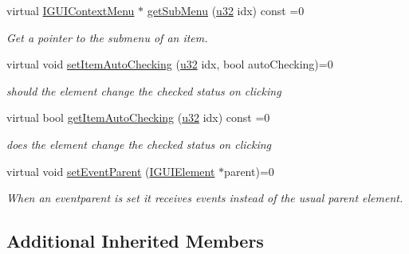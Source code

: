\begin{DoxyCompactItemize}
virtual \hyperlink{classirr_1_1gui_1_1IGUIContextMenu}{I\+G\+U\+I\+Context\+Menu} $\ast$ \hyperlink{classirr_1_1gui_1_1IGUIContextMenu_a296cfd0c4944b2c0bfb88973401fb824}{get\+Sub\+Menu} (\hyperlink{namespaceirr_a0416a53257075833e7002efd0a18e804}{u32} idx) const =0
\begin{DoxyCompactList}\small\item\em Get a pointer to the submenu of an item. \end{DoxyCompactList}\item 
\mbox{\label{classirr_1_1gui_1_1IGUIContextMenu_ab393d00ca81ee9482c5a81d19cc6e79e}} 
virtual void \hyperlink{classirr_1_1gui_1_1IGUIContextMenu_ab393d00ca81ee9482c5a81d19cc6e79e}{set\+Item\+Auto\+Checking} (\hyperlink{namespaceirr_a0416a53257075833e7002efd0a18e804}{u32} idx, bool auto\+Checking)=0
\begin{DoxyCompactList}\small\item\em should the element change the checked status on clicking \end{DoxyCompactList}\item 
\mbox{\label{classirr_1_1gui_1_1IGUIContextMenu_ae1c7364f115e633bcfc040864e30f4c1}} 
virtual bool \hyperlink{classirr_1_1gui_1_1IGUIContextMenu_ae1c7364f115e633bcfc040864e30f4c1}{get\+Item\+Auto\+Checking} (\hyperlink{namespaceirr_a0416a53257075833e7002efd0a18e804}{u32} idx) const =0
\begin{DoxyCompactList}\small\item\em does the element change the checked status on clicking \end{DoxyCompactList}\item 
\mbox{\label{classirr_1_1gui_1_1IGUIContextMenu_a2d87831a224817fc9c9dd8f41c69ac0a}} 
virtual void \hyperlink{classirr_1_1gui_1_1IGUIContextMenu_a2d87831a224817fc9c9dd8f41c69ac0a}{set\+Event\+Parent} (\hyperlink{classirr_1_1gui_1_1IGUIElement}{I\+G\+U\+I\+Element} $\ast$parent)=0
\begin{DoxyCompactList}\small\item\em When an eventparent is set it receives events instead of the usual parent element. \end{DoxyCompactList}\end{DoxyCompactItemize}
\subsection*{Additional Inherited Members}



